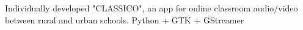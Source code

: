 Individually developed "CLASSICO", an app for online classroom audio/video between rural and urban schools.
Python + GTK + GStreamer